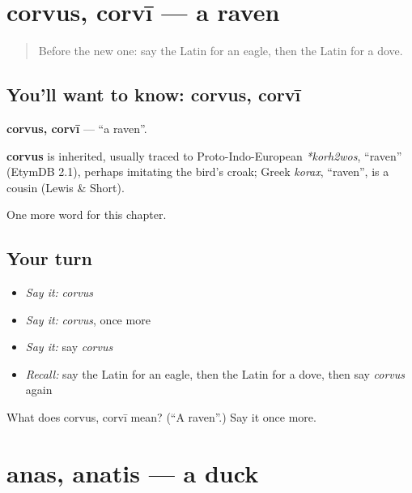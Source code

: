 \section[corvus, corvī]{corvus, corvī — a raven}

\label{lesson:LA-C131-corvus}



\begin{quote}
Before the new one: say the Latin for an eagle, then the Latin for a dove.
\end{quote}

\subsection*{You'll want to know: corvus, corvī}
\textbf{corvus, corvī} — \textquotedblleft{}a raven\textquotedblright{}.

\begin{cousinweb}
\textbf{corvus} is inherited, usually traced to Proto-Indo-European \emph{*korh2wos}, \textquotedblleft{}raven\textquotedblright{} (EtymDB 2.1), perhaps imitating the bird's croak; Greek \emph{korax}, \textquotedblleft{}raven\textquotedblright{}, is a cousin (Lewis \& Short).
\end{cousinweb}

\begin{grammarlens}[title={What you've built}]
One more word for this chapter.
\end{grammarlens}

\subsection*{Your turn}
\begin{itemize}
\raggedright
  \item \emph{Say it:} \emph{corvus}
  \item \emph{Say it:} \emph{corvus}, once more
  \item \emph{Say it:} say \emph{corvus}
  \item \emph{Recall:} say the Latin for an eagle, then the Latin for a dove, then say \emph{corvus} again
\end{itemize}

\begin{tcolorbox}[breakable,colback=teal!4,colframe=teal!35!black,title={Before you move on}]
What does corvus, corvī mean? (\textquotedblleft{}A raven\textquotedblright{}.) Say it once more.
\end{tcolorbox}
\section[anas, anatis]{anas, anatis — a duck}

